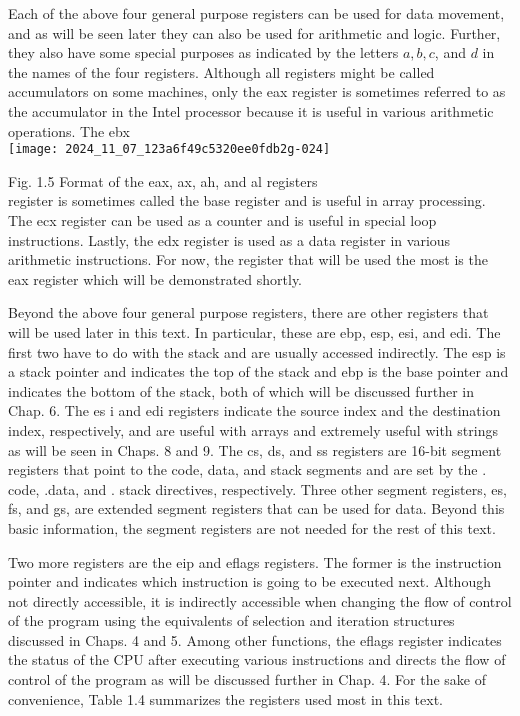 \documentclass[10pt]{article}
\begin{document}
Each of the above four general purpose registers can be used for data movement, and as will be seen later they can also be used for arithmetic and logic. Further, they also have some special purposes as indicated by the letters $a, b, c$, and $d$ in the names of the four registers. Although all registers might be called accumulators on some machines, only the eax register is sometimes referred to as the accumulator in the Intel processor because it is useful in various arithmetic operations. The ebx\\
\texttt{[image: 2024\_11\_07\_123a6f49c5320ee0fdb2g-024]}

Fig. 1.5 Format of the eax, ax, ah, and al registers\\
register is sometimes called the base register and is useful in array processing. The ecx register can be used as a counter and is useful in special loop instructions. Lastly, the edx register is used as a data register in various arithmetic instructions. For now, the register that will be used the most is the eax register which will be demonstrated shortly.

Beyond the above four general purpose registers, there are other registers that will be used later in this text. In particular, these are ebp, esp, esi, and edi. The first two have to do with the stack and are usually accessed indirectly. The esp is a stack pointer and indicates the top of the stack and ebp is the base pointer and indicates the bottom of the stack, both of which will be discussed further in Chap. 6. The es i and edi registers indicate the source index and the destination index, respectively, and are useful with arrays and extremely useful with strings as will be seen in Chaps. 8 and 9. The cs, ds, and ss registers are 16-bit segment registers that point to the code, data, and stack segments and are set by the . code, .data, and . stack directives, respectively. Three other segment registers, es, fs, and gs, are extended segment registers that can be used for data. Beyond this basic information, the segment registers are not needed for the rest of this text.

Two more registers are the eip and eflags registers. The former is the instruction pointer and indicates which instruction is going to be executed next. Although not directly accessible, it is indirectly accessible when changing the flow of control of the program using the equivalents of selection and iteration structures discussed in Chaps. 4 and 5. Among other functions, the eflags register indicates the status of the CPU after executing various instructions and directs the flow of control of the program as will be discussed further in Chap. 4. For the sake of convenience, Table 1.4 summarizes the registers used most in this text.
\end{document}

